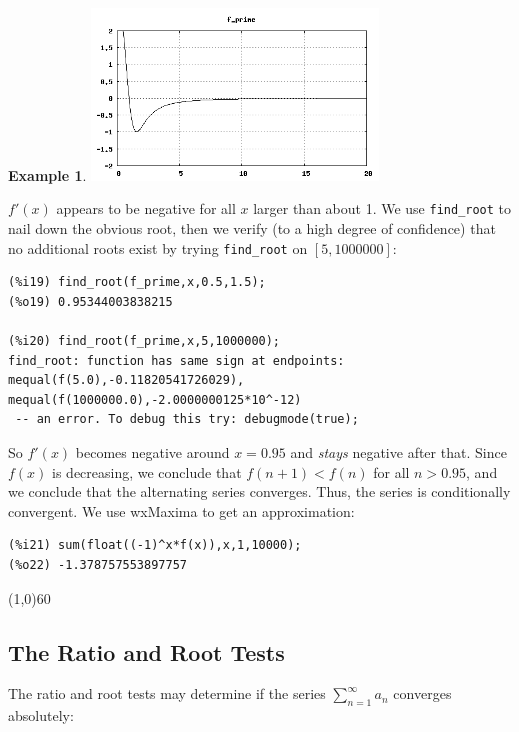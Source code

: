 \documentclass[10.5pt,twoside]{report}
\theoremstyle{definition}
\newtheorem{exmp}{Example}[section]
\begin{document}
\begin{exmp}
\includegraphics[width=3in]{example_6_3_5_1}

$f'(x)$ appears to be negative for all $x$ larger than about 1.  We use \verb|find_root| to nail down the obvious root, then we verify (to a high degree of confidence) that no additional roots exist by trying \verb|find_root| on $[5,1000000]$:

\begin{verbatim}
(%i19) find_root(f_prime,x,0.5,1.5);
(%o19) 0.95344003838215

(%i20) find_root(f_prime,x,5,1000000);
find_root: function has same sign at endpoints: mequal(f(5.0),-0.11820541726029),
mequal(f(1000000.0),-2.0000000125*10^-12)
 -- an error. To debug this try: debugmode(true);
\end{verbatim}

So $f'(x)$ becomes negative around $x=0.95$ and \textit{stays} negative after that.  Since $f(x)$ is decreasing, we conclude that $f(n+1)<f(n)$ for all $n>0.95$, and we conclude that the alternating series converges.  Thus, the series is conditionally convergent.  We use wxMaxima to get an approximation:

\begin{verbatim}
(%i21) sum(float((-1)^x*f(x)),x,1,10000);
(%o22) -1.378757553897757
\end{verbatim}


\end{exmp}

\line(1,0){60}
\linethickness{0.5mm}

\subsection{The Ratio and Root Tests}

The ratio and root tests may determine if the series $ \sum_{n=1}^{\infty} a_n$ converges absolutely:
\end{document}
